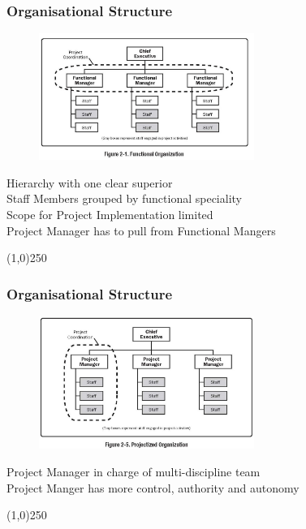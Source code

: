 \begin{frame}
\frametitle{Organisational Structure}
\begin{figure}
	\centering
		\includegraphics[width = 7cm]{images/Fig2-1.jpg}
	\label{fig:2-1}
\end{figure}Hierarchy with one clear superior\\
Staff Members grouped by functional speciality\\
Scope for Project Implementation limited\\
Project Manager has to pull from Functional Mangers\\
\end{frame}
\begin{center}\line(1,0){250}\end{center}



\begin{frame}
\frametitle{Organisational Structure}
\begin{figure}
	\centering
		\includegraphics[width = 7cm]{images/Fig2-5.jpg}
	\label{fig:2-5}
\end{figure}Project Manager in charge of multi-discipline team\\
Project Manger has more control, authority and autonomy\\
\end{frame}
\begin{center}\line(1,0){250}\end{center}



